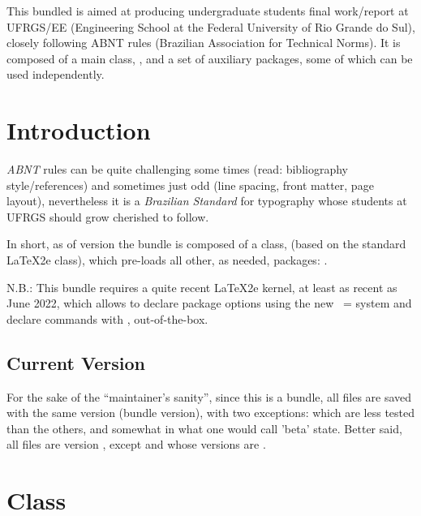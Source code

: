 \documentclass[dctools,english,tocdepth=3,secdepth=3]{ufrgscca} %
\begin{document}
	\dcMakeTitle


	\begin{dcAbstract}
		This bundled is aimed at producing undergraduate students final work/report at UFRGS/EE (Engineering School at the Federal University of Rio Grande do Sul), closely following ABNT rules (Brazilian Association for Technical Norms). It is composed of a main class, , and a set of auxiliary packages, some of which can be used independently.

	\end{dcAbstract}

\tableofcontents

	\section{Introduction}
	\emph{ABNT} rules can be quite challenging some times (read: bibliography style/references) and sometimes just odd (line spacing, front matter, page layout), nevertheless it is a \emph{Brazilian Standard} for typography whose students at UFRGS should grow cherished to follow.

	In short, as of version \ufrgsccaversion\space the bundle is composed of a class,  (based on the standard \LaTeX2e  class), which pre-loads all other, as needed, packages: .

	N.B.: This bundle requires a quite recent \LaTeX2e kernel, at least as recent as June 2022, which allows to declare package options using the new ~= system and declare commands with \Macro{\NewDocumentCommand}{}, out-of-the-box.

\subsection{Current Version}
For the sake of the “maintainer's sanity”, since this is a bundle, all files are saved with the same version (bundle version), with two exceptions:   which are less tested than the others, and somewhat in what one would call 'beta' state. Better said, all files are version \ufrgsccaversion, except  and  whose versions are \ufrgsccacurrversion.

\section{ Class}
\end{document}
